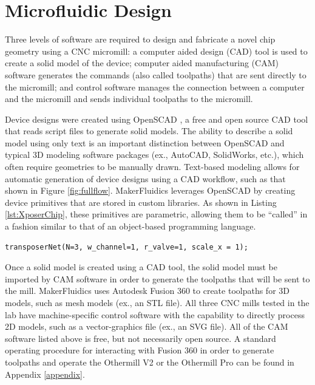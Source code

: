 \section{Microfluidic Design}
\label{sec:mfDesign}

Three levels of software are required to design and fabricate a novel chip geometry using a CNC micromill: a computer aided design (CAD) tool is used to create a solid model of the device; computer aided manufacturing (CAM) software generates the commands (also called toolpaths) that are sent directly to the micromill; and control software manages the connection between a computer and the micromill and sends individual toolpaths to the micromill. 

Device designs were created using OpenSCAD \cite{wikiOpenScad}, a free and open source CAD tool that reads script files to generate solid models. The ability to describe a solid model using only text is an important distinction between OpenSCAD and typical 3D modeling software packages (ex., AutoCAD, SolidWorks, etc.), which often require geometries to be manually drawn. Text-based modeling allows for automatic generation of device designs using a CAD workflow, such as that shown in Figure \ref{fig:fullflow}. MakerFluidics leverages OpenSCAD by creating device primitives that are stored in custom libraries. As shown in Listing \ref{lst:XposerChip}, these primitives are parametric, allowing them to be ``called'' in a fashion similar to that of an object-based programming language. 

\begin{minipage}{0.95\linewidth}
\centering 
	\begin{lstlisting}[caption={This single line of OpenSCAD creates the 3D model shown in Figure \ref{fig:mfParams}(A). Once a primitive is defined in OpenSCAD, the parameters associated with each device geometry can be modified and the corresponding solid model will adjust to reflect the changes.},label={lst:XposerChip}, frame=single, language=scad]
  transposerNet(N=3, w_channel=1, r_valve=1, scale_x = 1);
\end{lstlisting}
\end{minipage}

Once a solid model is created using a CAD tool, the solid model must be imported by CAM software in order to generate the toolpaths that will be sent to the mill. MakerFluidics uses Autodesk Fusion 360 to create toolpaths for 3D models, such as mesh models (ex., an STL file). All three CNC mills tested in the lab have machine-specific control software with the capability to directly process 2D models, such as a vector-graphics file (ex., an SVG file). All of the CAM software listed above is free, but not necessarily open source. A standard operating procedure for interacting with Fusion 360 in order to generate toolpaths and operate the Othermill V2 or the Othermill Pro can be found in Appendix \ref{appendix}.


